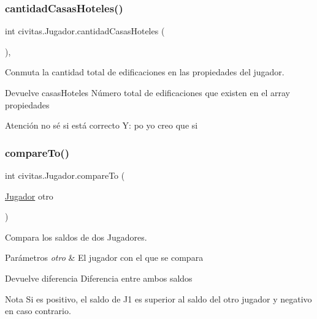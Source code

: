\subsubsection{\texorpdfstring{cantidad\+Casas\+Hoteles()}{cantidadCasasHoteles()}}
{\footnotesize\ttfamily int civitas.\+Jugador.\+cantidad\+Casas\+Hoteles (\begin{DoxyParamCaption}{ }\end{DoxyParamCaption})\hspace{0.3cm}{\ttfamily [inline]}, {\ttfamily [package]}}

Conmuta la cantidad total de edificaciones en las propiedades del jugador. \begin{DoxyReturn}{Devuelve}
casas\+Hoteles Número total de edificaciones que existen en el array propiedades 
\end{DoxyReturn}
\begin{DoxyWarning}{Atención}
no sé si está correcto Y\+: po yo creo que si 
\end{DoxyWarning}
\mbox{\label{classcivitas_1_1Jugador_ad18fdf2b46d7146b458a77a919d66b58}} 
\subsubsection{\texorpdfstring{compare\+To()}{compareTo()}}
{\footnotesize\ttfamily int civitas.\+Jugador.\+compare\+To (\begin{DoxyParamCaption}\item[{\hyperlink{classcivitas_1_1Jugador}{Jugador}}]{otro }\end{DoxyParamCaption})\hspace{0.3cm}{\ttfamily [inline]}}

Compara los saldos de dos Jugadores. 
\begin{DoxyParams}{Parámetros}
{\em otro} & El jugador con el que se compara \\
\hline
\end{DoxyParams}
\begin{DoxyReturn}{Devuelve}
diferencia Diferencia entre ambos saldos 
\end{DoxyReturn}
\begin{DoxyNote}{Nota}
Si es positivo, el saldo de J1 es superior al saldo del otro jugador y negativo en caso contrario. 
\end{DoxyNote}
\mbox{\label{classcivitas_1_1Jugador_a8f31f1a403355a68600c591ddf6d5418}} 
